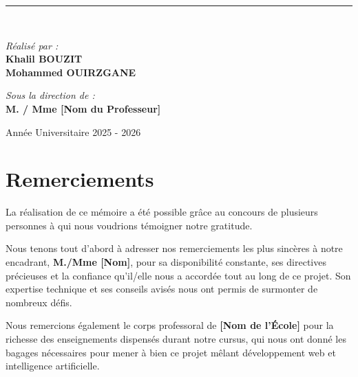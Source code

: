 \documentclass[12pt,a4paper]{report}
\begin{document}
\begin{titlepage}
\begin{center}
        \rule{\linewidth}{0.8mm} \\[2cm]
        
        \begin{minipage}{0.45\textwidth}
            \begin{flushleft} \large
                \emph{Réalisé par :}\\
                \textbf{Khalil BOUZIT}\\
                \textbf{Mohammed OUIRZGANE}
            \end{flushleft}
        \end{minipage}
        \hfill
        \begin{minipage}{0.45\textwidth}
            \begin{flushright} \large
                \emph{Sous la direction de :} \\
                \textbf{M. / Mme [Nom du Professeur]}
            \end{flushright}
        \end{minipage}
        
        \vfill
        
        {\large Année Universitaire 2025 - 2026}
    \end{center}
    \vspace*{0.5cm}
\end{titlepage}

\chapter*{Remerciements}
La réalisation de ce mémoire a été possible grâce au concours de plusieurs personnes à qui nous voudrions témoigner notre gratitude.

Nous tenons tout d'abord à adresser nos remerciements les plus sincères à notre encadrant, \textbf{M./Mme [Nom]}, pour sa disponibilité constante, ses directives précieuses et la confiance qu'il/elle nous a accordée tout au long de ce projet. Son expertise technique et ses conseils avisés nous ont permis de surmonter de nombreux défis.

Nous remercions également le corps professoral de \textbf{[Nom de l'École]} pour la richesse des enseignements dispensés durant notre cursus, qui nous ont donné les bagages nécessaires pour mener à bien ce projet mêlant développement web et intelligence artificielle.
\end{document}

